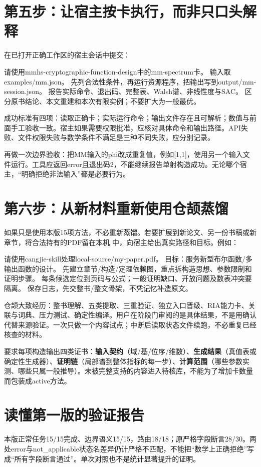 \section{第五步：让宿主按卡执行，而非只口头解释}
在已打开正确工作区的宿主会话中提交：
\begin{code}
请使用mmhs-cryptographic-function-design中的mm-spectrum卡。
输入取examples/mm.json。
先列合法性条件，再运行资源程序，把输出写到output/mm-session.json。
报告实际命令、退出码、完整表、Walsh谱、非线性度与SAC。
区分原书结论、本文重建和本次有限实例；不要扩大为一般最优。
\end{code}
成功标准有四项：读取正确卡；实际运行命令；输出文件存在且可解析；数值与前面手工验收一致。宿主如果需要权限批准，应核对具体命令和输出路径。API失败、文件权限失败与数学条件不满足是三种不同失败，应分别记录。

再做一次边界验收：把MM输入的phi改成重复值，例如[1,1]，使用另一个输入文件运行。工具应返回error且退出码2，不能继续报告单射构造成功。无论哪个宿主，“明确拒绝非法输入”都是必要行为。

\section{第六步：从新材料重新使用仓颉蒸馏}
如果只是使用本版15项方法，不必重新蒸馏。若要扩展到新论文、另一份书稿或新章节，将合法持有的PDF留在本机  中，向宿主给出真实路径和目标。例如：
\begin{code}
请使用cangjie-skill处理local-source/my-paper.pdf。
目标：服务新型布尔函数/多输出函数的设计。
先建立章节/构造/定理依赖图，重点拆构造思想、参数限制和证明步骤。
每条候选定位到页码与公式；一般证明缺口、开放问题及数表冲突要隔离。
保存日志，先交整书/整文骨架，不凭记忆补造原文。
\end{code}
仓颉大致经历：整书理解、五类提取、三重验证、独立入口晋级、RIA能力卡、关联与词典、压力测试、确定性编译\cite{cangjie}。用户在阶段门审阅的是具体结果，不是用确认代替来源验证。一次只做一个内容试点；中断后读取状态文件续跑，不必重复已经核查的材料。

要求每项构造输出四类证书：\textbf{输入契约}（域/基/位序/维数）、\textbf{生成结果}（真值表或确定性生成器）、\textbf{证明链}（局部谱到整体指标的每一步）、\textbf{计算范围}（哪些参数实测、哪些只属一般推导）。未被完整支持的内容进入待核库，不能为了增加卡数量而包装成active方法。

\section{读懂第一版的验证报告}
本版正常任务15/15完成、边界语义15/15，路由18/18；原严格字段断言28/30。两处error与not\_applicable状态名差异仍计严格不匹配，不能把“数学上正确拒绝”写成“所有字段断言通过”。单次对照也不是统计显著提升的证明。

